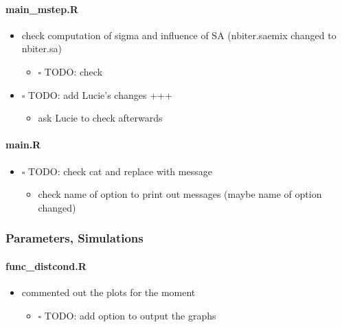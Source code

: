 \documentclass[
]{article}
\providecommand{\tightlist}{%
  \setlength{\itemsep}{0pt}\setlength{\parskip}{0pt}}
\begin{document}
\hypertarget{main_mstep.r}{%
\paragraph{main\_mstep.R}\label{main_mstep.r}}

\begin{itemize}
\tightlist
\item
  check computation of sigma and influence of SA (nbiter.saemix changed
  to nbiter.sa)

  \begin{itemize}
  \tightlist
  \item
    \(\square\) TODO: check
  \end{itemize}
\item
  \(\square\) TODO: add Lucie's changes +++

  \begin{itemize}
  \tightlist
  \item
    ask Lucie to check afterwards
  \end{itemize}
\end{itemize}

\hypertarget{main.r}{%
\paragraph{main.R}\label{main.r}}

\begin{itemize}
\tightlist
\item
  \(\square\) TODO: check cat and replace with message

  \begin{itemize}
  \tightlist
  \item
    check name of option to print out messages (maybe name of option
    changed)
  \end{itemize}
\end{itemize}

\hypertarget{parameters-simulations}{%
\subsubsection{Parameters, Simulations}\label{parameters-simulations}}

\hypertarget{func_distcond.r}{%
\paragraph{func\_distcond.R}\label{func_distcond.r}}

\begin{itemize}
\tightlist
\item
  commented out the plots for the moment

  \begin{itemize}
  \tightlist
  \item
    \(\square\) TODO: add option to output the graphs
  \end{itemize}
\end{itemize}
\end{document}
